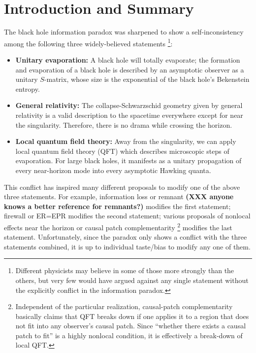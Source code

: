 \documentclass[aps,showpacs,twocolumn,floats,prd,superscriptaddress,nofootinbib]{revtex4-1}
\begin{document}
\maketitle


\onecolumngrid

\section{Introduction and Summary}

The black hole information paradox \cite{Haw76a} was sharpened to show a self-inconsistency among the following three widely-believed statements \cite{AMPS}
\footnote{Different physicists may believe in some of those more strongly than the others, but very few would have argued against any single statement without the explicitly conflict in the information paradox.}:
\begin{itemize}
\item {\bf Unitary evaporation:} A black hole will totally evaporate; the formation and evaporation of a black hole is described by an asymptotic observer as a unitary $S$-matrix, whose size is the exponential of the black hole's Bekenstein entropy.
\item {\bf General relativity:} The collapse-Schwarzschid geometry given by general relativity is a valid description to the spacetime everywhere except for near the singularity.
Therefore, there is no drama while crossing the horizon.
\item {\bf Local quantum field theory:} Away from the singularity, we can apply local quantum field theory (QFT) which describes microscopic steps of evaporation. 
For large black holes, it manifests as a unitary propagation of every near-horizon mode into every asymptotic Hawking quanta.
\end{itemize}

This conflict has inspired many different proposals to modify one of the above three statements. 
For example, information loss or remnant \cite{Bek94} {\bf (XXX anyone knows a better reference for remnants?)} modifies the first statement; 
firewall \cite{BraPir09,AMPS} or ER=EPR \cite{MalSus13} modifies the second statement;
various proposals of nonlocal effects near the horizon \cite{Gid12,DodSil15,OsuPag16} or causal patch complementarity \cite{HuiYan13,IlgYan13,LowTho14}
\footnote{Independent of the particular realization, causal-patch complementarity basically claims that QFT breaks down if one applies it to a region that does not fit into any observer's causal patch. 
Since ``whether there exists a causal patch to fit'' is a highly nonlocal condition, it is effectively a break-down of local QFT.} 
modifies the last statement.
Unfortunately, since the paradox only shows a conflict with the three statements combined, it is up to individual taste/bias to modify any one of them. 
\end{document}

